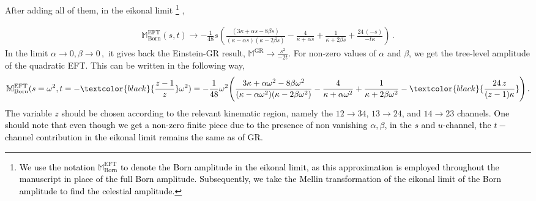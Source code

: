 After adding all of them, in the eikonal limit \footnote{ \textcolor{black}{We use the notation \(\mathbb{M}^{\textrm{EFT}}_{\textrm{Born}}\) to denote the Born amplitude in the eikonal limit, as this approximation is employed throughout the manuscript in place of the full Born amplitude. Subsequently, we take the Mellin transformation of the eikonal limit of the Born amplitude to find the celestial amplitude.}}
,  

\begin{align}
\mathbb{M}_{\text{Born}}^{\textrm{EFT}}(s,t)\to-\frac{1}{48} s \left(\frac{ (3 \kappa+\alpha  s-8 \beta  s)}{(\kappa-\alpha  s) (\kappa-2 \beta  s)}-\frac{4 }{\kappa+\alpha  s}+\frac{1}{\kappa+2 \beta  s}+\frac{24 \,(-s) }{-t \kappa }\right)\,.\label{3.9p}
\end{align}
In the limit $\alpha\rightarrow 0,\beta\rightarrow 0\,,$ it gives back the Einstein-GR result, $\mathbb{M}^{\textrm{GR}}\rightarrow \frac{s^2}{-2t}$. For non-zero values of $\alpha$ and $\beta $, we get the tree-level amplitude of the quadratic EFT. This can be written in the following way,
\begin{align}
    \begin{split}
        \mathbb{M}_{\text{Born}}^{\textrm{EFT}} (s=\omega^2,t=-\textcolor{black}{\frac{z-1}{z} }\omega^2)=-\frac{1}{48} \omega ^2 \Bigg(  \frac{3 \kappa+\alpha\omega^2-8 \beta  \omega^2}{(\kappa-\alpha  \omega^2) (\kappa-2 \beta  \omega^2)}-\frac{4 }{\kappa+\alpha  \omega^2}+\frac{1}{\kappa+2 \beta  \omega^2}-\textcolor{black}{\frac{24 \,z}{(z-1)\kappa}}\Bigg)\,.\label{3.8p}
    \end{split}
\end{align}
The variable $z$ should be chosen according to the relevant kinematic region, namely the $12\to 34$, $13\to 24$, and $14\to 23$ channels. \textcolor{black}{One should note that even though we get a non-zero finite piece due to the presence of non vanishing $\alpha,\beta$, in the $s$ and $u$-channel, the $t-$channel contribution in the eikonal limit remains the same as of GR}.  \par

